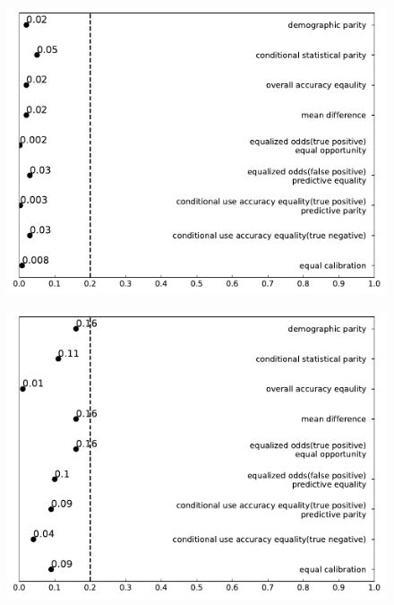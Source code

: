 \documentclass[conference]{IEEEtran}
\begin{document}
\begin{figure}[h]
\begin{minipage}[b]{0.48\linewidth}
        \centering
        \includegraphics[width=\linewidth]{Non-25 - 45}
        \label{fig:2}
    \end{minipage}
    \hfill
    \begin{minipage}[b]{0.48\linewidth}
        \centering
        \includegraphics[width=\linewidth]{Misdemeanor}
        \label{fig:2}
    \end{minipage}
    \hfill
    \begin{minipage}[b]{0.48\linewidth}
        \centering

\end{minipage}
\end{figure}
\end{document}
